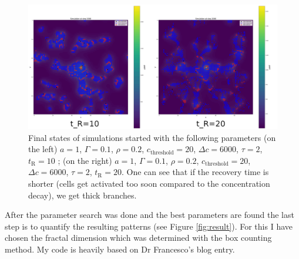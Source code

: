 \documentclass[a4paper,12pt]{article}
\begin{document}
\begin{figure}
\centering
 \includegraphics[width=\textwidth]{recovery.png}
 \caption{Final states of simulations started with the following parameters (on the left) $a=1$, $\Gamma=0.1$, $\rho=0.2$, $c_\text{threshold}=20$, $\Delta c=6000$, $\tau=2$, $t_\text{R}=10$ ; (on the right) $a=1$, $\Gamma=0.1$, $\rho=0.2$, $c_\text{threshold}=20$, $\Delta c=6000$, $\tau=2$, $t_\text{R}=20$. One can see that if the recovery time is shorter (cells get activated too soon compared to the concentration decay), we get thick branches.}
 \label{fig:recovery}
\end{figure}

After the parameter search was done and the best parameters are found the last step is to quantify the resulting patterns (see Figure \ref{fig:result}). For this I have chosen the fractal dimension which was determined with the box counting method. My code is heavily based on Dr Francesco's \cite{francesco2016} blog entry.
\end{document}
